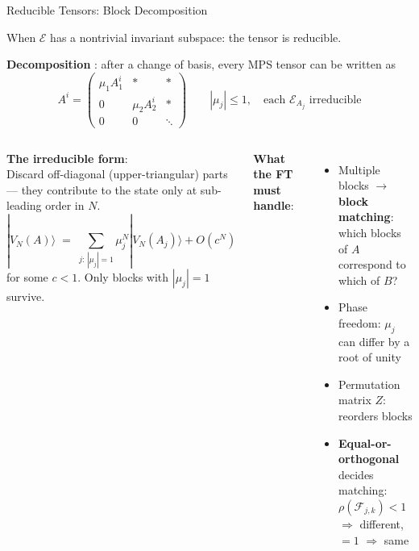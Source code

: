 \documentclass[aspectratio=169,10pt]{beamer}
\begin{document}
\begin{frame}{Reducible Tensors: Block Decomposition}
    \vspace{-0.7em}

    {\small When $\mathcal{E}$ has a nontrivial invariant subspace: the
    tensor is reducible.}

    \vspace{0.2em}
    \textbf{Decomposition} \cite{Cirac2017Irreducible}:
    after a change of basis, every MPS tensor can be written as
    \vspace{-0.3em}
    \[
        A^i = \begin{pmatrix}
            \mu_1 A_1^i & * & * \\
            0 & \mu_2 A_2^i & * \\
            0 & 0 & \ddots
        \end{pmatrix}
        \qquad |\mu_j| \leq 1, \quad \text{each } \mathcal{E}_{A_j} \text{ irreducible}
    \]

    \vspace{-0.1em}
    \begin{columns}[T]
        \textbf{The irreducible form}:\\[2pt]
        {\small Discard off-diagonal (upper-triangular) parts ---
        they contribute to the state only at sub-leading order in $N$.}
        \vspace{-0.3em}
        \[
            |V_N(A)\rangle \;=\; \sum_{j:\,|\mu_j|=1}
            \mu_j^N |V_N(A_j)\rangle + O(c^N)
        \]
        \vspace{-0.5em}
        {\small for some $c < 1$.
        Only blocks with $|\mu_j| = 1$ survive.}

        \textbf{What the FT must handle}:
        \begin{itemize}\itemsep0.05em\small
            \item Multiple blocks $\to$ \textbf{block matching}:\\
                  {\scriptsize which blocks of $A$ correspond to which of $B$?}
            \item Phase freedom: $\mu_j$ can differ by a root of unity
            \item Permutation matrix $Z$: reorders blocks
            \item \textbf{Equal-or-orthogonal} decides matching:\\
                  $\rho(\mathcal{F}_{j,k}) < 1$ $\Rightarrow$ different,
                  $= 1$ $\Rightarrow$ same
        \end{itemize}
    \end{columns}


\end{frame}
\end{document}
